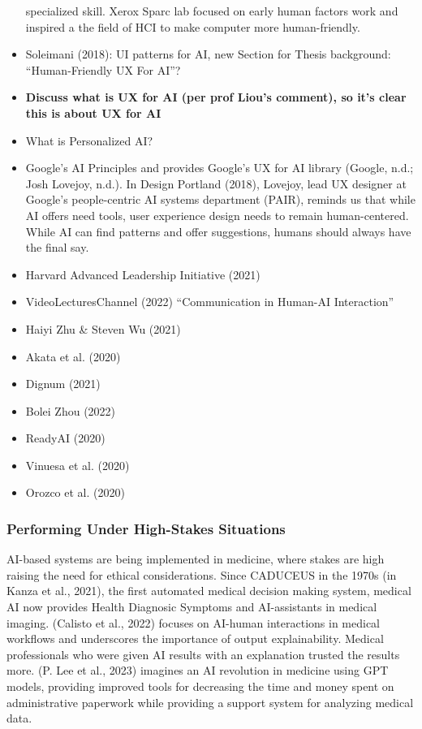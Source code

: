 \documentclass[
  letterpaper,
  DIV=11,
  numbers=noendperiod]{scrartcl}
\begin{document}
\begin{itemize}
  specialized skill. Xerox Sparc lab focused on early human factors work
  and inspired a the field of HCI to make computer more human-friendly.
\item
  Soleimani (2018): UI patterns for AI, new Section for Thesis
  background: ``Human-Friendly UX For AI''?
\item
  \textbf{Discuss what is UX for AI (per prof Liou's comment), so it's
  clear this is about UX for AI}
\item
  What is Personalized AI?
\item
  Google's AI Principles and provides Google's UX for AI library
  (Google, n.d.; Josh Lovejoy, n.d.). In Design Portland (2018),
  Lovejoy, lead UX designer at Google's people-centric AI systems
  department (PAIR), reminds us that while AI offers need tools, user
  experience design needs to remain human-centered. While AI can find
  patterns and offer suggestions, humans should always have the final
  say.
\item
  Harvard Advanced Leadership Initiative (2021)
\item
  VideoLecturesChannel (2022) ``Communication in Human-AI Interaction''
\item
  Haiyi Zhu \& Steven Wu (2021)
\item
  Akata et al. (2020)
\item
  Dignum (2021)
\item
  Bolei Zhou (2022)
\item
  ReadyAI (2020)
\item
  Vinuesa et al. (2020)
\item
  Orozco et al. (2020)
\end{itemize}

\subsubsection{Performing Under High-Stakes
Situations}\label{performing-under-high-stakes-situations}

AI-based systems are being implemented in medicine, where stakes are
high raising the need for ethical considerations. Since CADUCEUS in the
1970s (in Kanza et al., 2021), the first automated medical decision
making system, medical AI now provides Health Diagnosic Symptoms and
AI-assistants in medical imaging. (Calisto et al., 2022) focuses on
AI-human interactions in medical workflows and underscores the
importance of output explainability. Medical professionals who were
given AI results with an explanation trusted the results more. (P. Lee
et al., 2023) imagines an AI revolution in medicine using GPT models,
providing improved tools for decreasing the time and money spent on
administrative paperwork while providing a support system for analyzing
medical data.
\end{document}
